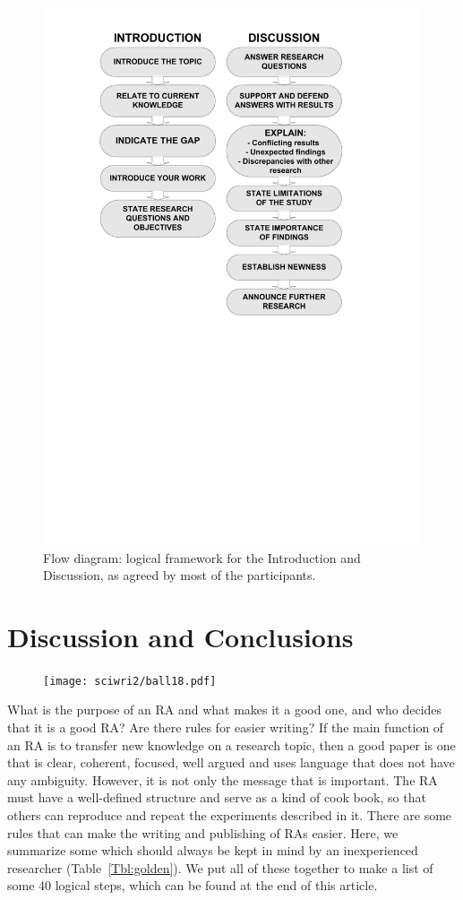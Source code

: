 \documentclass[graybox,envcountchap,sectrefs,UStrade]{svmono}
\begin{document}
\begin{figure}[htb]
\begin{center}
\includegraphics[width=.65\textwidth]{Fig_RAS.pdf}
\caption{Flow diagram: logical framework for the Introduction and Discussion, as agreed by most of the participants.} \label{Fig:introdisc}
\end{center}
\end{figure}

\section*{Discussion and Conclusions}

\begin{figure}
\vspace{-20pt}
\texttt{[image: sciwri2/ball18.pdf]}
\vspace{-20pt}
\end{figure}

What is the purpose of an RA and what makes it a good one, and who decides that it is a good RA? Are there rules for easier writing? If the main function of an RA is to transfer new knowledge on a research topic, then a good paper is one that is clear, coherent, focused, well argued and uses language that does not have any ambiguity. However, it is not only the message that is important. The RA must have a well-defined structure and serve as a kind of cook book, so that others can reproduce and repeat the experiments described in it. There are some rules that can make the writing and publishing of RAs easier. Here, we summarize some which should always be kept in mind by an inexperienced researcher (Table~\ref{Tbl:golden}). We put all of these together to make a list of some 40 logical steps, which can be found at the end of this article.\par
\end{document}
